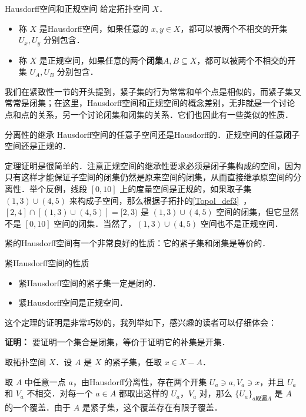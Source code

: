 \begin{definition}{Hausdorff空间和正规空间}
给定拓扑空间 $X$．
\begin{itemize}
\item 称 $X$ 是Hausdorff空间，如果任意的 $x,y\in X$，都可以被两个不相交的开集 $U_x, U_y$ 分别包含．
\item 称 $X$ 是正规空间，如果任意的两个\textbf{闭集}$A, B\subseteq X$，都可以被两个不相交的开集 $U_A, U_B$ 分别包含．
\end{itemize}
\end{definition}

我们在紧致性一节的开头提到，紧子集的行为常常和单个点是相似的，而紧子集又常常是闭集；在这里，Hausdorff空间和正规空间的概念差别，无非就是一个讨论点和点的关系，另一个讨论闭集和闭集的关系．它们也因此有一些类似的性质．

\begin{theorem}{分离性的继承}
Hausdorff空间的任意子空间还是Hausdorff的．正规空间的任意\textbf{闭}子空间还是正规的．
\end{theorem}

定理证明是很简单的．注意正规空间的继承性要求必须是闭子集构成的空间，因为只有这样才能保证子空间的闭集仍然是原来空间的闭集，从而直接继承原空间的分离性．举个反例，线段 $[0,10]$ 上的度量空间是正规的，如果取子集 $(1,3)\cup(4,5)$ 来构成子空间，那么根据子拓扑的\autoref{Topol_def3}~，$[2,4]\cap[(1,3)\cup(4,5)]=[2,3)$ 是 $(1,3)\cup(4,5)$ 空间的闭集，但它显然不是 $[0,10]$ 空间的闭集．当然了，$(1,3)\cup(4,5)$ 空间也不是正规空间．

紧的Hausdorff空间有一个非常良好的性质：它的紧子集和闭集是等价的．
\begin{theorem}{紧Hausdorff空间的性质}
\begin{itemize}
\item 紧Hausdorff空间的紧子集一定是闭的．
\item 紧Hausdorff空间是正规空间．

\end{itemize}
\end{theorem}

这个定理的证明是非常巧妙的，我列举如下，感兴趣的读者可以仔细体会：

\textbf{证明：}
要证明一个集合是闭集，等价于证明它的补集是开集．

取拓扑空间 $X$．设 $A$ 是 $X$ 的紧子集，任取 $x\in X-A$．

取 $A$ 中任意一点 $a$，由Hausdorff分离性，存在两个开集 $U_a\ni a, V_a\ni x$，并且 $U_a$ 和 $V_a$ 不相交．对每一个 $a\in A$ 都取出这样的 $U_a$，$V_a$ 对，那么 $\{U_a\}_{a\text{取遍}A}$ 是 $A$ 的一个覆盖．由于 $A$ 是紧子集，这个覆盖存在有限子覆盖．

